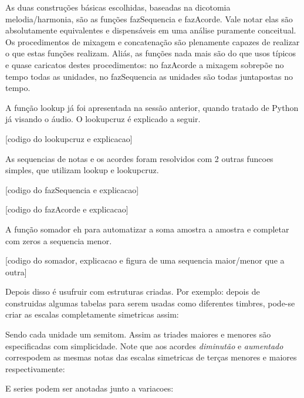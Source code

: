 As duas construções básicas escolhidas, baseadas na dicotomia melodia/harmonia, são
as funções fazSequencia e fazAcorde. Vale notar elas são absolutamente equivalentes e dispensáveis
em uma análise puramente conceitual. Os procedimentos de mixagem e concatenação são
plenamente capazes de realizar o que estas funções realizam. Aliás, as funções nada
mais são do que usos típicos e quase caricatos destes procedimentos: no fazAcorde a mixagem
sobrepõe no tempo todas as unidades, no fazSequencia as unidades são todas juntapostas no tempo.

 A função
lookup já foi apresentada na sessão anterior, quando tratado de Python já visando o áudio.
O lookupcruz é explicado a seguir.

[codigo do lookupcruz e explicacao]

As sequencias de notas e os acordes foram resolvidos com 2 outras funcoes simples,
que utilizam lookup e lookupcruz.

[codigo do fazSequencia e explicacao]

[codigo do fazAcorde e explicacao]

A função somador eh para automatizar a soma amostra a amostra e completar com zeros a
sequencia menor.

[codigo do somador, explicacao e figura de uma sequencia maior/menor que a outra]

Depois disso é usufruir com estruturas criadas. Por exemplo: depois de construidas
algumas tabelas para serem usadas como diferentes timbres, pode-se criar as
escalas completamente simetricas assim:


% 

Sendo cada unidade um semitom. Assim as triades maiores e menores
são especificadas com simplicidade. Note que aos acordes \emph{diminutão} e
\emph{aumentado} correspodem as mesmas notas das escalas simetricas de terças menores
e maiores respectivamente:



E series podem ser anotadas junto a variacoes:

